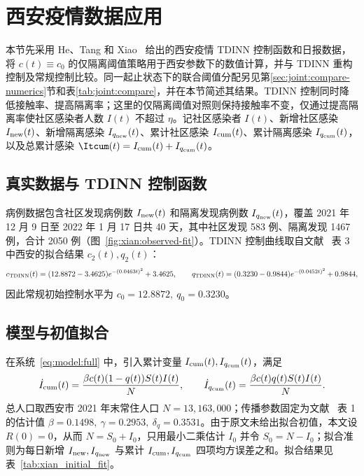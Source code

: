 \section{西安疫情数据应用}
\label{sec:xian}

本节先采用 He、Tang 和 Xiao~\cite{He2023TDINN} 给出的西安疫情 TDINN 控制函数和日报数据，将 $c(t)\equiv c_0$ 的仅隔离阈值策略用于西安参数下的数值计算，并与 TDINN 重构控制及常规控制比较。同一起止状态下的联合阈值分配另见第\ref{sec:joint:compare-numerics}节和表\ref{tab:joint:compare}，并在本节简述其结果。TDINN 控制同时降低接触率、提高隔离率；这里的仅隔离阈值对照则保持接触率不变，仅通过提高隔离率使社区感染者人数 $I(t)$ 不超过 $\eta$。记社区感染者 $I(t)$、新增社区感染 $I_{\rm new}(t)$、新增隔离感染 $I_{q_{\rm new}}(t)$、累计社区感染 $I_{\rm cum}(t)$、累计隔离感染 $I_{q_{\rm cum}}(t)$，以及总累计感染 $\Itcum(t)=I_{\rm cum}(t)+I_{q_{\rm cum}}(t)$。

\subsection{真实数据与 TDINN 控制函数}
病例数据包含社区发现病例数 $I_{\rm new}(t)$ 和隔离发现病例数 $I_{q_{\rm new}}(t)$，覆盖 2021 年 12 月 9 日至 2022 年 1 月 17 日共 40 天，其中社区发现 583 例、隔离发现 1467 例，合计 2050 例（图~\ref{fig:xian:observed-fit}）。TDINN 控制曲线取自文献~\cite{He2023TDINN} 表 3 中西安的拟合结果 $c_2(t),q_2(t)$：
\begin{equation}
c_{\rm TDINN}(t)=(12.8872-3.4625)e^{-(0.0463t)^2}+3.4625,\qquad
q_{\rm TDINN}(t)=(0.3230-0.9844)e^{-(0.0452t)^2}+0.9844,
\end{equation}
因此常规初始控制水平为 $c_0=12.8872,\ q_0=0.3230$。


\subsection{模型与初值拟合}
在系统~\eqref{eq:model:full} 中，引入累计变量 $I_{\rm cum}(t),I_{q_{\rm cum}}(t)$，满足
\begin{equation}
\dot I_{\rm cum}(t)=\frac{\beta c(t)(1-q(t))S(t)I(t)}{N},\qquad
\dot I_{q_{\rm cum}}(t)=\frac{\beta c(t)q(t)S(t)I(t)}{N}.
\end{equation}
总人口取西安市 2021 年末常住人口 $N=13{,}163{,}000$；传播参数固定为文献~\cite{He2023TDINN} 表 1 的估计值 $\beta=0.1498,\ \gamma=0.2953,\ \delta_q=0.3531$。由于原文未给出拟合初值，本文设 $R(0)=0$，从而 $N=S_0+I_0$，只用最小二乘估计 $I_0$ 并令 $S_0=N-I_0$；拟合准则为每日新增 $I_{\rm new},I_{q_{\rm new}}$ 与累计 $I_{\rm cum},I_{q_{\rm cum}}$ 四项均方误差之和。拟合结果见表~\ref{tab:xian_initial_fit}。

